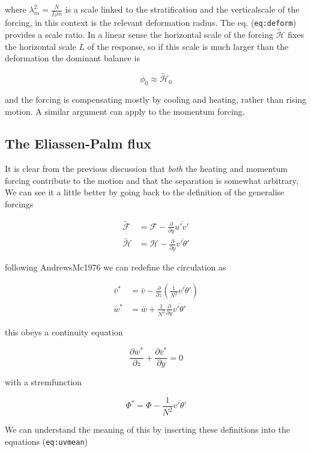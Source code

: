 where \(\lambda_m^2 = \frac{N}{f_0 m}\) is a scale linked to the
stratification and the verticalscale of the forcing, in this context is
the relevant deformation radius. The eq. (\texttt{eq:deform}) provides a
scale ratio. In a linear sense the horizontal scale of the forcing
\(\widetilde{\mathcal{H}}\) fixes the horizontal scale \(L\) of the
response, so if this scale is much larger than the deformation the
dominant balance is

\[\phi_0 \approx  \widetilde{\mathcal{H}}_0\]

and the forcing is compensating mostly by cooling and heating, rather
than rising motion. A similar argument can apply to the momentum
forcing.


\subsection{The Eliassen-Palm flux}\label{the-eliassen-palm-flux}

It is clear from the previous discussion that \emph{both} the heating
and momentum forcing contribute to the motion and that the separation is
somewhat arbitrary, We can see it a little better by going back to the
definition of the generalise forcings

\[\begin{aligned}
\widetilde{\mathcal{F}}&= \mathcal{F}-\frac{\partial }{\partial y}\overline{u'v'} \\
\widetilde{\mathcal{H}}&= \mathcal{H}-\frac{\partial }{\partial y}\overline{v'\theta'}
\end{aligned}\]

following AndrewsMc1976 we can redefine the circulation as

\[
\begin{aligned}
\bar{v}^* &= \bar{v}-\frac{\partial }{\partial z}\left(\frac{1}{N^2} \overline{v'\theta'}\right)\\
\bar{w}^* &= \bar{w}+\frac{1}{N^2}\frac{\partial }{\partial y}\overline{v'\theta'}
\end{aligned}
\]

this obeys a continuity equation

\[\frac{\partial \bar{w}^*}{\partial z} + \frac{\partial \bar{v}^*}{\partial y} = 0\]

with a stremfunction

\[\Phi^* = \Phi -\frac{1}{N^2} \overline{v'\theta'}\]

We can understand the meaning of this by inserting these definitions
into the equations (\texttt{eq:uvmean})

